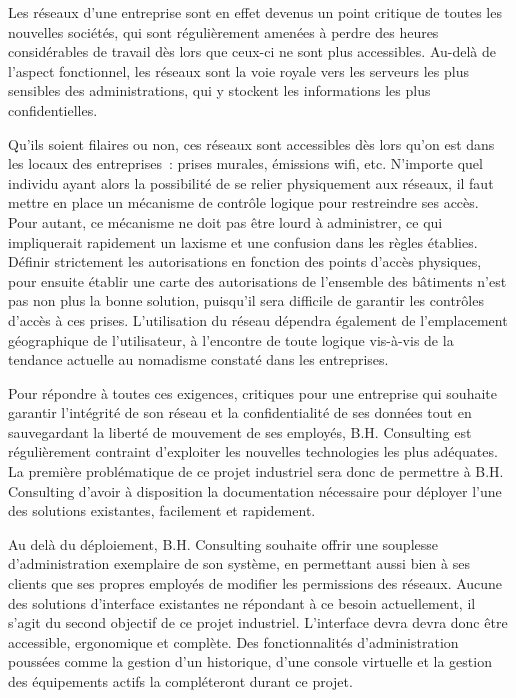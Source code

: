 Les réseaux d'une entreprise sont en effet devenus un point critique de toutes les nouvelles sociétés, qui sont régulièrement amenées à perdre des heures considérables de travail dès lors que ceux-ci ne sont plus accessibles. Au-delà de l'aspect fonctionnel, les réseaux sont la voie royale vers les serveurs les plus sensibles des administrations, qui y stockent les informations les plus confidentielles.

Qu'ils soient filaires ou non, ces réseaux sont accessibles dès lors qu'on est dans les locaux des entreprises~: prises murales, émissions wifi, etc. N'importe quel individu ayant alors la possibilité de se relier physiquement aux réseaux, il faut mettre en place un mécanisme de contrôle logique pour restreindre ses accès. Pour autant, ce mécanisme ne doit pas être lourd à administrer, ce qui impliquerait rapidement un laxisme et une confusion dans les règles établies. Définir strictement les autorisations en fonction des points d'accès physiques, pour ensuite établir une carte des autorisations de l'ensemble des bâtiments n'est pas non plus la bonne solution, puisqu'il sera difficile de garantir les contrôles d'accès à ces prises. L'utilisation du réseau dépendra également de  l'emplacement géographique de l'utilisateur, à l'encontre de toute logique vis-à-vis de la tendance actuelle au nomadisme constaté dans les entreprises.

Pour répondre à toutes ces exigences, critiques pour une entreprise qui souhaite garantir l'intégrité de son réseau et la confidentialité de ses données tout en sauvegardant la liberté de mouvement de ses employés, B.H. Consulting est régulièrement contraint d'exploiter les nouvelles technologies les plus adéquates. La première problématique de ce projet industriel sera donc de permettre à B.H. Consulting d'avoir à disposition la documentation nécessaire pour déployer l'une des solutions existantes, facilement et rapidement.

Au delà du déploiement, B.H. Consulting souhaite offrir une souplesse d'administration exemplaire de son système, en permettant aussi bien à ses clients que ses propres employés de modifier les permissions des réseaux. Aucune des solutions d'interface existantes ne répondant à ce besoin actuellement, il s'agit du second objectif de ce projet industriel. L'interface devra devra donc être accessible, ergonomique et complète. Des fonctionnalités d'administration poussées comme la gestion d'un historique, d'une console virtuelle et la gestion des équipements actifs la compléteront durant ce projet.

